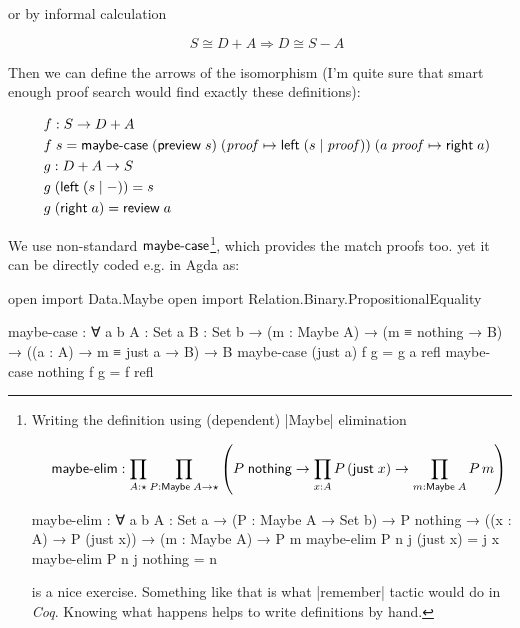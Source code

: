 \documentclass{article}
\begin{document}
or by informal calculation

\begin{equation}
\quad S \cong D + A \Rightarrow D \cong S - A
\end{equation}

Then we can define the arrows of the isomorphism (I'm quite sure that smart enough proof search would find exactly these definitions):

\begin{equation}
\begin{aligned}
\quad &f : S \to D + A \\
      &f\; s = \mathsf{maybe\textnormal{-}case}\;(\mathsf{preview}\;s)\; (\mathit{proof} \mapsto \mathsf{left}\;(s \mid \mathit{proof}))\; (a\; \mathit{proof} \mapsto \mathsf{right}\; a)\\
      &g : D + A \to S \\
      &g\;(\mathsf{left}\; (s \mid - )) = s \\
      &g\;(\mathsf{right}\; a) = \mathsf{review}\;a \\
\end{aligned}
\end{equation}

We use non-standard $\mathsf{maybe\textnormal{-}case}$\footnote{
Writing the definition using (dependent) |Maybe| elimination

\begin{equation}
\quad \mathsf{maybe\textnormal{-}elim} : \prod_{A : \star} \prod_{P : \mathsf{Maybe}\;A \to \star} \left( P\;\mathsf{nothing} \to \prod_{x : A} P\,(\mathsf{just}\;x) \to \prod_{m : \mathsf{Maybe}\;A} P\,m  \right)
\end{equation}

\begin{code}
maybe-elim : ∀ {a b} {A : Set a}
           → (P : Maybe A → Set b)
           → P nothing
           → ((x : A) → P (just x))
           → (m : Maybe A)
           → P m
maybe-elim P n j (just x) = j x
maybe-elim P n j nothing  = n
\end{code}

is a nice exercise. Something like that is what |remember| tactic would
do in \emph{Coq}. Knowing what happens helps to write definitions by hand.
}, which provides
the match proofs too.
yet it can be directly coded e.g. in Agda as:

\begin{code}
open import Data.Maybe
open import Relation.Binary.PropositionalEquality

maybe-case : ∀ {a b} {A : Set a} {B : Set b}
           → (m : Maybe A)
           → (m ≡ nothing → B)
           → ((a : A) → m ≡ just a → B)
           → B
maybe-case (just a) f g = g a refl
maybe-case nothing  f g = f refl
\end{code}
\end{document}
